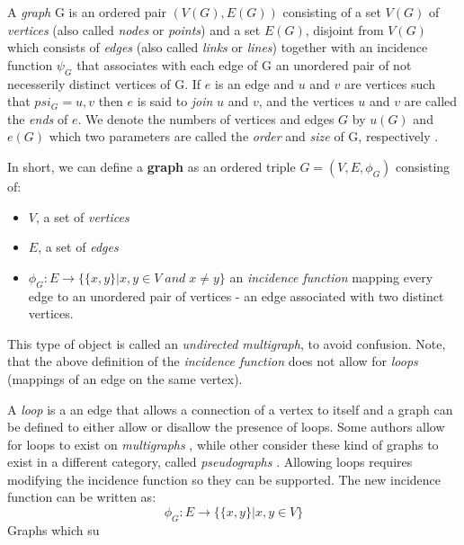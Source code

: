 \begin{definition}\label{graph_def}
  A \textit{graph} G is an ordered pair \footnotemark{} $(V(G), E(G))$ consisting of a set
$V(G)$ of \textit{vertices} (also called \textit{nodes} or \textit{points}) and a set
$E(G)$, disjoint from $V(G)$ which consists of \textit{edges} (also called \textit{links}
or \textit{lines}) together with an incidence function $\psi_G$ that associates with each
edge of G an unordered pair of not necesserily distinct vertices of G.  If $e$ is an edge
and $u$ and $v$ are vertices such that $psi_G ={u, v}$ then $e$ is said to \textit{join}
$u$ and $v$, and the vertices $u$ and $v$ are called the \textit{ends} of $e$. We denote
the numbers of vertices and edges $G$ by $u(G)$ and $e(G)$ which two parameters are called
the \textit{order} and \textit{size} of G, respectively \cite{book:2008}.

  In short, we can define a \textbf{graph} as an ordered triple $G=(V, E, \phi_G)$
consisting of:
  \begin{itemize}
  \item $V$, a set of \textit{vertices}
  \item $E$, a set of \textit{edges}
  \item $\phi_G: E \rightarrow \{\{x, y\} | x, y \in V \; and \; x \neq y\}$ an
\textit{incidence function} mapping every edge to an unordered pair of vertices - an edge
associated with two distinct vertices.
  \end{itemize} This type of object is called an \textit{undirected multigraph}, to avoid
confusion. Note, that the above definition of the \textit{incidence function} does not
allow for \textit{loops} (mappings of an edge on the same vertex).

A \textit{loop} is a an edge that allows a connection of a vertex to itself and a graph can
be defined to either allow or disallow the presence of loops. Some authors allow for loops
to exist on \textit{multigraphs} \cite{article:bollobas}, while other consider these kind
of graphs to exist in a different category, called \textit{pseudographs} \cite{book:Gary}.
Allowing loops requires modifying the incidence function so they can be supported. The new
incidence function can be written as:
\begin{equation*} \phi_G : E \rightarrow \{\{x, y \} | x,y \in V\} \end{equation*}
Graphs which su
  




\end{definition}



